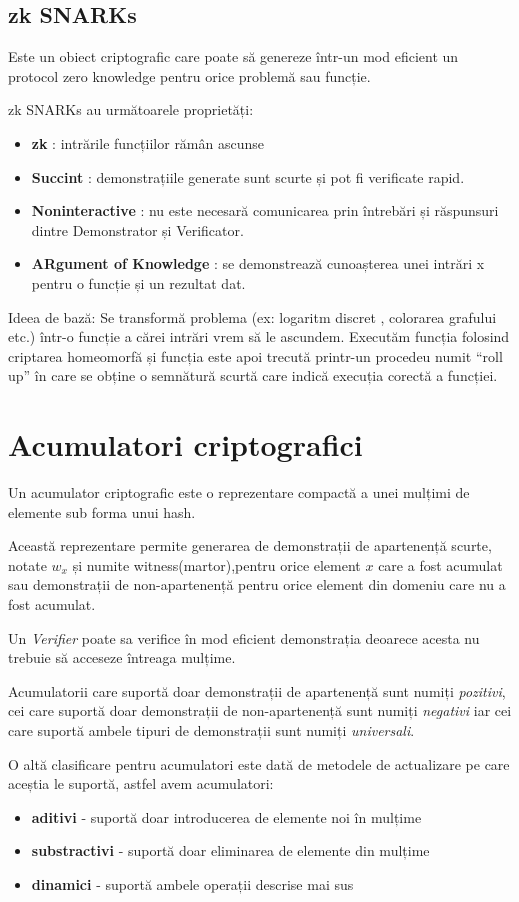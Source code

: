 \documentclass[12pt, letterpaper]{article}
\begin{document}
\subsection{zk SNARKs}
Este un obiect criptografic care poate să genereze într-un mod eficient un protocol zero knowledge pentru orice problemă sau funcție. 

zk SNARKs au următoarele proprietăți:
\begin{itemize}
\item {\textbf{zk} : intrările funcțiilor rămân ascunse} 
\item{\textbf{Succint} : demonstrațiile generate sunt scurte și pot fi verificate rapid.}
\item{\textbf{Noninteractive} : nu este necesară comunicarea prin întrebări și răspunsuri dintre Demonstrator și Verificator.}
\item{\textbf{ARgument of Knowledge} : se demonstrează cunoașterea unei intrări x pentru o funcție și un rezultat dat.}
\end{itemize}
Ideea de bază:
Se transformă problema (ex: logaritm discret , colorarea grafului etc.) într-o funcție a cărei intrări vrem să le ascundem.
Executăm funcția folosind criptarea homeomorfă și funcția este apoi trecută printr-un procedeu numit “roll up” în care se obține o semnătură scurtă care indică execuția corectă a funcției.

\pagebreak
\section{Acumulatori criptografici}
Un acumulator criptografic este o reprezentare compactă a unei mulțimi de elemente sub forma unui hash. 

Această reprezentare permite generarea de demonstrații de apartenență scurte, notate $w_x$ și numite witness(martor),pentru orice element $x$ care a fost acumulat sau demonstrații de non-apartenență pentru orice element din domeniu care nu a fost acumulat.

Un \emph{Verifier} poate sa verifice în mod eficient demonstrația deoarece acesta nu trebuie să acceseze întreaga mulțime.

Acumulatorii care suportă doar demonstrații de apartenență sunt numiți \emph{pozitivi}, cei care suportă doar demonstrații de non-apartenență sunt numiți \emph{negativi} iar cei care suportă ambele tipuri de demonstrații sunt numiți \emph{universali}.

O altă clasificare pentru acumulatori este dată de metodele de actualizare pe care aceștia le suportă, astfel avem acumulatori:
\begin{itemize}
    \item{\textbf{aditivi} - suportă doar introducerea de elemente noi în mulțime}
    \item{\textbf{substractivi} - suportă doar eliminarea de elemente din mulțime}
    \item{\textbf{dinamici} - suportă ambele operații descrise mai sus}
\end{itemize}
\end{document}
